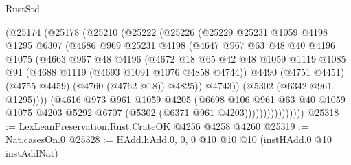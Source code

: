 \begin{lexlean}{RustStd}
\begin{coremodule}
{\begin{coremodule}
{{{{{{{{{{{{{{{{{{{{{{{{{{{{{{{{{{{                    (@25174
                      (@25178
                        (@25210
                          (@25222
                            (@25226
                              (@25229
                                @25231
                                @1059
                                @4198
                                @1295
                                @6307
                                (@4686
                                  @969
                                  @25231
                                  @4198
                                  (@4647
                                    @967
                                    @63
                                    @48
                                    @40
                                    @4196
                                    @1075
                                    (@4663
                                      @967
                                      @48
                                      @4196
                                      (@4672
                                        @18
                                        @65
                                        @42
                                        @48
                                        @1059
                                        @1119
                                        @1085
                                        @91
                                        (@4688 @1119 (@4693 @1091 @1076 @4858 @4744))
                                        @4490
                                        (@4751 @4451)
                                        (@4755 @4459)
                                        (@4760 (@4762 @18))
                                        @4825))
                                    @4743))
                                (@5302 (@6342 @961 @1295))))
                            (@4616
                              @973
                              @961
                              @1059
                              @4205
                              (@6698
                                @106
                                @961
                                @63
                                @40
                                @1059
                                @1075
                                @4203
                                @5292
                                @6707
                                (@5302 (@6371 @961 @4203))))))))))))))))
@25318 := LexLeanPreservation.Rust.CrateOK @4256 @4258 @4260
@25319 := Nat.casesOn.{0}
@25328 := HAdd.hAdd.{0, 0, 0} @10 @10 @10 (instHAdd.{0} @10 instAddNat)
}}}}}}}}}}}}}}}}}}}}}}}}}}}}}}}}}}}
\end{coremodule}}
\end{coremodule}
\end{lexlean}
